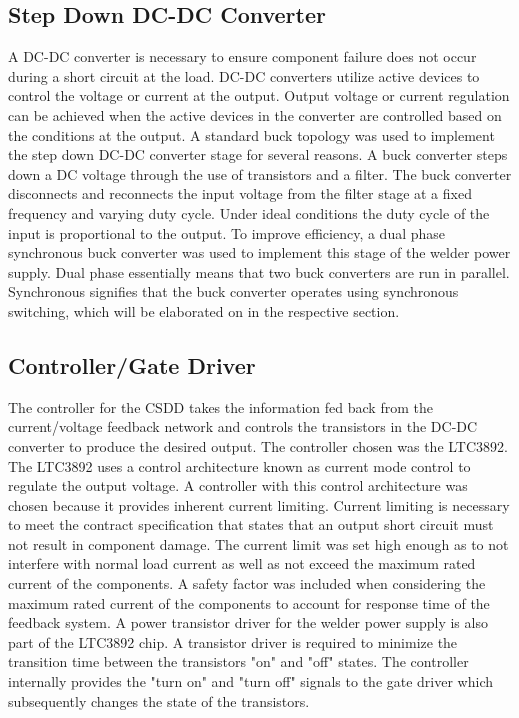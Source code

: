 \documentclass[11pt]{article}
\begin{document}
    \subsection{Step Down DC-DC Converter}
    A DC-DC converter is necessary to ensure component failure does not occur during a short circuit at the load. DC-DC converters utilize active devices to control the voltage or current at the output. Output voltage or current regulation can be achieved when the active devices in the converter are controlled based on the conditions at the output. A standard buck topology was used to implement the step down DC-DC converter stage for several reasons. A buck converter steps down a DC voltage through the use of transistors and a filter. The buck converter disconnects and reconnects the input voltage from the filter stage at a fixed frequency and varying duty cycle. Under ideal conditions the duty cycle of the input is proportional to the output. To improve efficiency, a dual phase synchronous buck converter was used to implement this stage of the welder power supply. Dual phase essentially means that two buck converters are run in parallel. Synchronous signifies that the buck converter operates using synchronous switching, which will be elaborated on in the respective section. 
        
    \subsection{Controller/Gate Driver}
        The controller for the CSDD takes the information fed back from the current/voltage feedback network and controls the transistors in the DC-DC converter to produce the desired output. The controller chosen was the LTC3892. The LTC3892 uses a control architecture known as current mode control to regulate the output voltage. A controller with this control architecture was chosen because it provides inherent current limiting. Current limiting is necessary to meet the contract specification that states that an output short circuit must not result in component damage. The current limit was set high enough as to not interfere with normal load current as well as not exceed the maximum rated current of the components. A safety factor was included when considering the maximum rated current of the components to account for response time of the feedback system. A power transistor driver for the welder power supply is also part of the LTC3892 chip. A transistor driver is required to minimize the transition time between the transistors "on" and "off" states. The controller internally provides the "turn on" and "turn off" signals to the gate driver which subsequently changes the state of the transistors.
        
\end{document}
